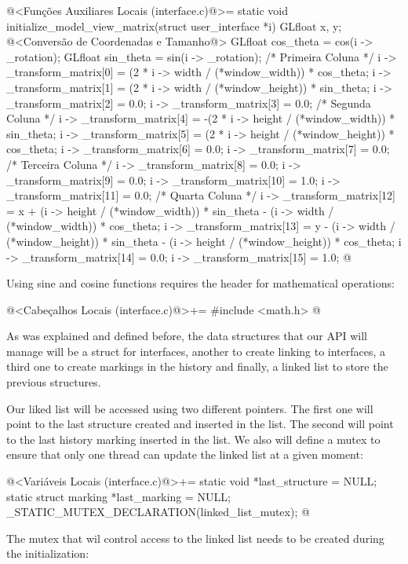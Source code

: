 \iniciocodigo
@<Funções Auxiliares Locais (interface.c)@>=
static void initialize_model_view_matrix(struct user_interface *i){
  GLfloat x, y;
  @<Conversão de Coordenadas e Tamanho@>
  GLfloat cos_theta = cos(i -> _rotation);
  GLfloat sin_theta = sin(i -> _rotation);
  /* Primeira Coluna */
  i -> _transform_matrix[0] = (2 * i -> width / (*window_width)) *
    cos_theta;
  i -> _transform_matrix[1] = (2 * i -> width / (*window_height)) *
    sin_theta;
  i -> _transform_matrix[2] = 0.0;
  i -> _transform_matrix[3] = 0.0;
  /* Segunda Coluna */
  i -> _transform_matrix[4] = -(2 * i -> height / (*window_width)) *
     sin_theta;
  i -> _transform_matrix[5] = (2 * i -> height / (*window_height)) *
    cos_theta;
  i -> _transform_matrix[6] = 0.0;
  i -> _transform_matrix[7] = 0.0;
  /* Terceira Coluna */
  i -> _transform_matrix[8] = 0.0;
  i -> _transform_matrix[9] = 0.0;
  i -> _transform_matrix[10] = 1.0;
  i -> _transform_matrix[11] = 0.0;
  /* Quarta Coluna */
  i -> _transform_matrix[12] = x +
    (i -> height / (*window_width)) * sin_theta -
    (i -> width / (*window_width)) * cos_theta;
  i -> _transform_matrix[13] = y -
    (i -> width / (*window_height)) * sin_theta -
    (i -> height / (*window_height)) * cos_theta;
  i -> _transform_matrix[14] = 0.0;
  i -> _transform_matrix[15] = 1.0;
}
@
\fimcodigo

Using sine and cosine functions requires the header for mathematical
operations:

\iniciocodigo
@<Cabeçalhos Locais (interface.c)@>+=
#include <math.h>
@
\fimcodigo


As was explained and defined before, the data structures that our API
will manage will be a struct for interfaces, another to create linking
to interfaces, a third one to create markings in the history and
finally, a linked list to store the previous structures.

Our liked list will be accessed using two different pointers. The
first one will point to the last structure created and inserted in the
list. The second will point to the last history marking inserted in
the list. We also will define a mutex to ensure that only one thread
can update the linked list at a given moment:

\iniciocodigo
@<Variáveis Locais (interface.c)@>+=
static void *last_structure = NULL;
static struct marking *last_marking = NULL;
_STATIC_MUTEX_DECLARATION(linked_list_mutex);
@
\fimcodigo

The mutex that wil control access to the linked list needs to be
created during the initialization:

